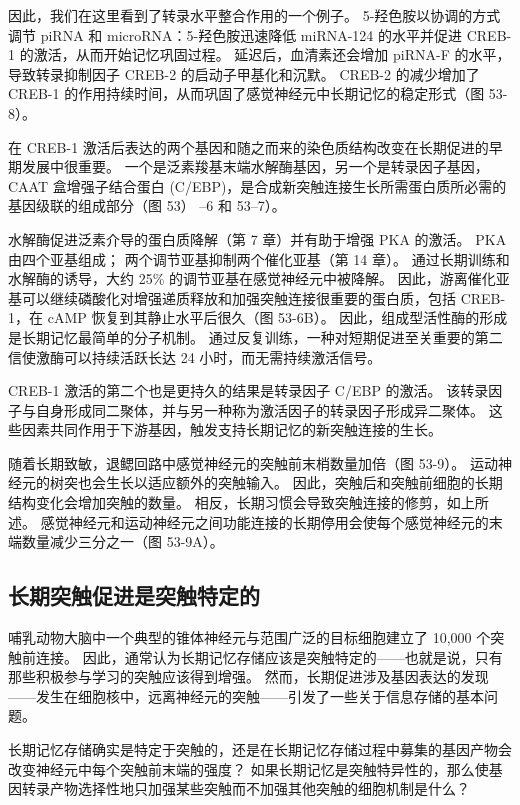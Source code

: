 因此，我们在这里看到了转录水平整合作用的一个例子。 5-羟色胺以协调的方式调节 piRNA 和 microRNA：5-羟色胺迅速降低 miRNA-124 的水平并促进 CREB-1 的激活，从而开始记忆巩固过程。 延迟后，血清素还会增加 piRNA-F 的水平，导致转录抑制因子 CREB-2 的启动子甲基化和沉默。 CREB-2 的减少增加了 CREB-1 的作用持续时间，从而巩固了感觉神经元中长期记忆的稳定形式（图 53-8）。

在 CREB-1 激活后表达的两个基因和随之而来的染色质结构改变在长期促进的早期发展中很重要。 一个是泛素羧基末端水解酶基因，另一个是转录因子基因，CAAT 盒增强子结合蛋白 (C/EBP)，是合成新突触连接生长所需蛋白质所必需的基因级联的组成部分（图 53） –6 和 53–7）。

水解酶促进泛素介导的蛋白质降解（第 7 章）并有助于增强 PKA 的激活。 PKA 由四个亚基组成； 两个调节亚基抑制两个催化亚基（第 14 章）。 通过长期训练和水解酶的诱导，大约 25\% 的调节亚基在感觉神经元中被降解。 因此，游离催化亚基可以继续磷酸化对增强递质释放和加强突触连接很重要的蛋白质，包括 CREB-1，在 cAMP 恢复到其静止水平后很久（图 53-6B）。 因此，组成型活性酶的形成是长期记忆最简单的分子机制。 通过反复训练，一种对短期促进至关重要的第二信使激酶可以持续活跃长达 24 小时，而无需持续激活信号。

CREB-1 激活的第二个也是更持久的结果是转录因子 C/EBP 的激活。 该转录因子与自身形成同二聚体，并与另一种称为激活因子的转录因子形成异二聚体。 这些因素共同作用于下游基因，触发支持长期记忆的新突触连接的生长。

随着长期致敏，退鳃回路中感觉神经元的突触前末梢数量加倍（图 53-9）。 运动神经元的树突也会生长以适应额外的突触输入。 因此，突触后和突触前细胞的长期结构变化会增加突触的数量。 相反，长期习惯会导致突触连接的修剪，如上所述。 感觉神经元和运动神经元之间功能连接的长期停用会使每个感觉神经元的末端数量减少三分之一（图 53-9A）。



\subsection{长期突触促进是突触特定的}
哺乳动物大脑中一个典型的锥体神经元与范围广泛的目标细胞建立了 10,000 个突触前连接。 因此，通常认为长期记忆存储应该是突触特定的——也就是说，只有那些积极参与学习的突触应该得到增强。 然而，长期促进涉及基因表达的发现——发生在细胞核中，远离神经元的突触——引发了一些关于信息存储的基本问题。

长期记忆存储确实是特定于突触的，还是在长期记忆存储过程中募集的基因产物会改变神经元中每个突触前末端的强度？ 如果长期记忆是突触特异性的，那么使基因转录产物选择性地只加强某些突触而不加强其他突触的细胞机制是什么？

